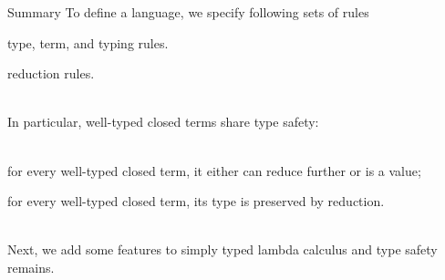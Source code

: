 \begin{frame}{Summary}
  To define a language, we specify following sets of rules 
  \begin{description}[Semantics]
    \item[Syntax] type, term, and typing rules. 
    \item[Semantics] reduction rules.
  \end{description}
  ~\\
  In particular, well-typed closed terms share type safety:
  \\~\\
  \begin{description}
    \item[Progress Theorem] for every well-typed closed term, it either can 
      reduce further or is a value;
    \item[Preservation Theorem] 
      for every well-typed closed term, its type is preserved by reduction. 
  \end{description}
  ~\\

  Next, we add some features to simply typed lambda calculus
  and type safety remains. 
\end{frame}
